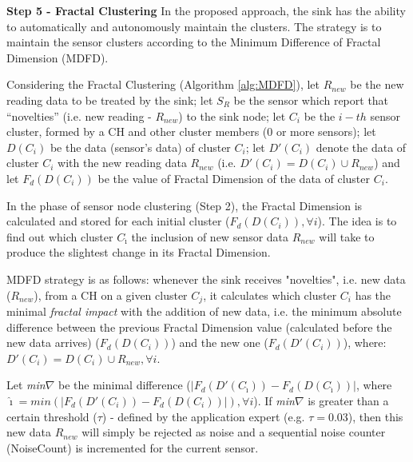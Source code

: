 \documentclass{acm_proc_article-sp}
\begin{document}
{\bf Step 5 - Fractal Clustering}
In the proposed approach, the sink has the ability to automatically and
autonomously maintain the clusters. The strategy is to maintain the sensor
clusters according to the Minimum Difference of Fractal Dimension (MDFD).
\vspace*{-.3cm}

Considering the Fractal Clustering (Algorithm \ref{alg:MDFD}), let $R_{new}$ be
the new reading data to be treated by the sink; let $S_{R}$ be the sensor which
report that ``novelties'' (i.e. new reading - $R_{new}$) to the sink node; let
$C_i$ be the $i-th$ sensor cluster, formed by a CH and other cluster members (0
or more sensors); let $D(C_i)$ be the data (sensor's data) of cluster $C_i$; let
$D'(C_i)$ denote the data of cluster $C_i$ with the new reading data $R_{new}$
(i.e. $D'(C_i) = D(C_i) \cup R_{new}$) and let $F_{d}(D(C_i))$ be the value of
Fractal Dimension of the data of cluster $C_i$.
\vspace*{-.6cm}

In the phase of sensor node clustering (Step 2), the Fractal Dimension is 
calculated and stored for each initial cluster
($F_{d}(D(C_i)), \forall i$). The idea is to find out which cluster
$C_{\hat{\imath}}$ the inclusion of new sensor data $R_{new}$ will take to produce
the slightest change in its Fractal Dimension.
\vspace*{-.3cm}

MDFD strategy is as follows:
whenever the sink receives "novelties", i.e. new data ($R_{new}$), from a CH on
a given cluster $C_j$, it calculates which cluster $C_i$ has the minimal
\textit{fractal impact} with the addition of new data, i.e. the minimum absolute
difference between the previous Fractal Dimension value (calculated before the
new data arrives) ($F_d(D(C_i))$) and the new one ($F_d(D'(C_i))$), where:
$D'(C_i) = D(C_i) \cup R_{new}, \forall i$.
\vspace*{-.3cm}

Let {\it min}$\nabla$ be the minimal difference ($|F_d(D'(C_{\hat{\imath}})) -
F_d(D(C_{\hat{\imath}}))|$, where $\hat{\imath} = min(|F_d(D'(C_i)) - F_d(D(C_i))|),
\forall i$). If {\it min}$\nabla$ is greater than a certain threshold ($\tau$) -
defined by the application expert (e.g. $\tau = 0.03$), then this new data
$R_{new}$ will simply be rejected as noise and a sequential noise counter
(NoiseCount) is incremented for the current sensor.
\vspace*{-.3cm}
\end{document}
